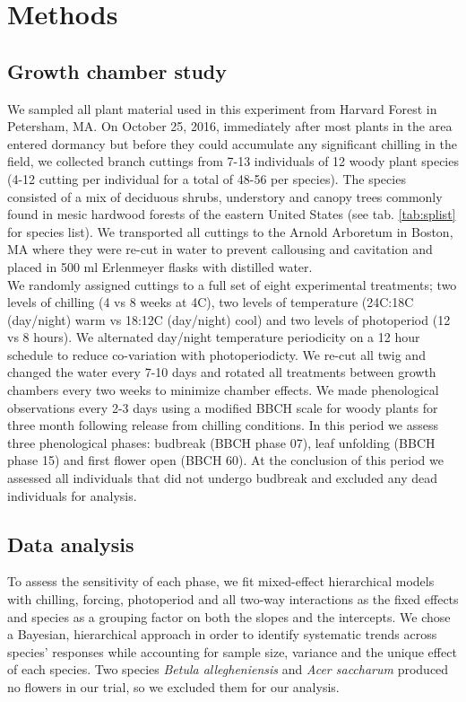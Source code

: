 \documentclass[11pt]{article}
\begin{document}
\section*{Methods}

\subsection*{Growth chamber study}
\noindent We sampled all plant material used in this experiment from Harvard Forest in Petersham, MA. On October 25, 2016, immediately after most plants in the area entered dormancy but before they could accumulate any significant chilling in the field,  we collected branch cuttings from 7-13 individuals of 12 woody plant species (4-12 cutting per individual for a total of 48-56 per species). The species consisted of a mix of deciduous shrubs, understory and canopy trees commonly found in mesic hardwood forests of the eastern United States (see tab. \ref{tab:splist} for species list). We transported all cuttings to the Arnold Arboretum in Boston, MA where they were re-cut in water to prevent callousing and cavitation and placed in 500 ml Erlenmeyer flasks with distilled water.\\ 

\noindent We randomly assigned cuttings to a full set of eight experimental treatments; two levels of chilling (4 vs 8 weeks at 4\degree C), two levels of temperature (24\degree C:18\degree C (day/night) warm vs 18\degree:12\degree C (day/night) cool) and two levels of photoperiod (12 vs 8 hours). We alternated day/night temperature periodicity on a 12 hour schedule to reduce co-variation with photoperiodicty. We re-cut all twig and changed the water every 7-10 days and rotated all treatments between growth chambers every two weeks to minimize chamber effects. We made phenological observations every 2-3 days using a modified BBCH scale for woody plants \citep{Finn2007} for three month following release from chilling conditions. In this period we assess three phenological phases: budbreak (BBCH phase 07), leaf unfolding (BBCH phase 15) and first flower open (BBCH 60). At the conclusion of this period we assessed all individuals that did not undergo budbreak and excluded any dead individuals for analysis.

\subsection*{Data analysis}
\noindent To assess the sensitivity of each phase, we fit mixed-effect hierarchical models with chilling, forcing, photoperiod and all two-way interactions as the fixed effects and species as a grouping factor on both the slopes and the intercepts. We chose a Bayesian, hierarchical approach in order to identify systematic trends across species' responses while accounting for sample size, variance and the unique effect of each species. Two species \textit{Betula allegheniensis} and \textit{Acer saccharum} produced no flowers in our trial, so we excluded them for our analysis.\\
\end{document}
